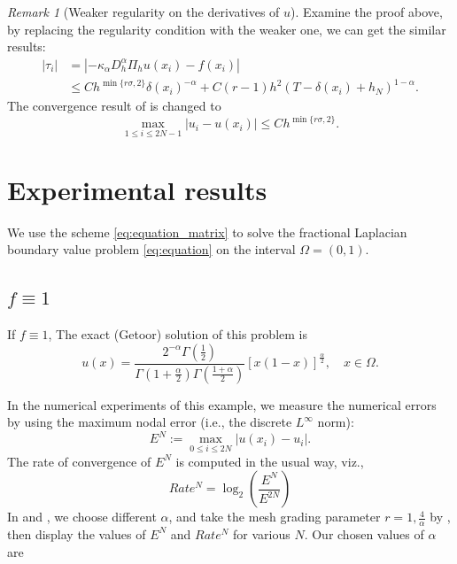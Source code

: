 \documentclass{amsart}
\theoremstyle{definition}
\theoremstyle{remark}
\newtheorem{remark}[theorem]{Remark}
\numberwithin{equation}{section}
\begin{document}
\begin{remark}[Weaker regularity on the derivatives of \(u\)]
  Examine the proof above, by replacing the regularity condition with the weaker one, we can get the similar results:
    \begin{equation*} 
      \begin{aligned}
        |\tau_i| &= | -\kappa_\alpha D_h^{\alpha} \Pi_hu(x_i) - f(x_i) | \\
        &\le  C  h^{\min\{r\sigma, 2\}} \delta(x_i)^{-\alpha}
        + C(r-1) h^2 (T-\delta(x_{i}) + h_N)^{1-\alpha}.
      \end{aligned}
    \end{equation*}
  The convergence result of  is changed to
    \begin{equation*} 
      \max_{1\le i \le 2N-1} |u_i - u(x_i)| \le C h^{\min\{r\sigma, 2\}}.
    \end{equation*}
\end{remark}



\section{Experimental results}
\label{sec:experiments}

We use the scheme \eqref{eq:equation_matrix} to solve the fractional Laplacian boundary value problem \eqref{eq:equation} on the interval \(\Omega = (0, 1)\).

\subsection{$f\equiv 1$}

If \(f\equiv 1\), The exact (Getoor) solution of this problem is
\begin{equation*}
    u(x) = \frac{2^{-\alpha} \Gamma(\frac{1}{2})}{\Gamma(1+\frac{\alpha}{2})\Gamma(\frac{1+\alpha}{2}) } \left[ x(1-x) \right]^{\frac{\alpha}{2}}, \quad x\in \Omega.
\end{equation*}

In the numerical experiments of this example, we measure the numerical errors by using the maximum nodal error (i.e., the discrete \(L^\infty\) norm):
\begin{equation*}
    E^N := \max_{0\le i\le 2N} |u(x_i) - u_i|.
\end{equation*}
The rate of convergence of \(E^N\) is computed in the usual way, viz.,
\begin{equation*}
    Rate^N = \log_2 \left( \frac{E^N}{E^{2N}} \right)
\end{equation*}
In  and , we choose different \(\alpha\), and take the mesh grading parameter \(r=1, \frac{4}{\alpha}\) by  , then display the values of \(E^N\) and \(Rate^N\) for various \(N\). Our chosen values of \(\alpha\) are
\end{document}
